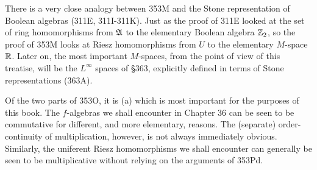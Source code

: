 {There is a very close analogy between 353M and the Stone representation
of Boolean algebras (311E, 311I-311K). %
Just as the proof of 311E
looked at the set of ring homomorphisms from $\frak A$ to the elementary
Boolean algebra $\Bbb Z_2$, so the proof of 353M looks at Riesz
homomorphisms from $U$ to the elementary $M$-space $\Bbb R$.   Later on,
the most important $M$-spaces, from the point of view of this treatise,
will be the $L^{\infty}$ spaces of \S363, explicitly defined in terms of
Stone representations (363A).
     
Of the two parts of 353O, it is (a) which is most important for the
purposes of this book.   The $f$-algebras we shall encounter in Chapter
36 can be seen to be commutative for different, and more elementary,
reasons.  The (separate) order-continuity of multiplication, however, is
not always immediately obvious.   Similarly, the uniferent Riesz
homomorphisms we shall encounter can generally be seen to be
multiplicative without relying on the arguments of 353Pd.
}%
     
     
\discrpage
     
